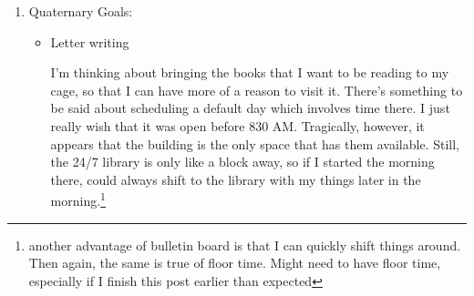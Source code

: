 \documentclass[12pt]{article}
\renewcommand{\,}{\textsuperscript{,}}
\begin{document}
\begin{enumerate}
\begin{itemize}

\item Blogging?

I'm finally going to post this one.

\item Reading?

Nope, but I think that part of it is that I'm not reading anything worthwhile right now.\footnote{meaning that like none of the books I keep on my phone are dragging me in, and otherwise I don't keep books nearby enough}

\item Web Noveling?

No, but I would like to get back into it.  
Thankfully, the bulletin board\footnote{the more times I type it, the fewer attempts it takes to spell correctly. Also, yes I'm hoping that the repetition makes me actually get it} has my notes from before giving up.

\item Guitar?

Spent a solid few minutes last night working through a few exercises.  
I'm getting better at reading staff notation for the guitar, which feels really nice, if also more than a little strange.

\item Other hobbies?

Not so much.

\end{itemize}

\item Quaternary Goals:

\begin{itemize}

\item Letter writing

I'm thinking about bringing the books that I want to be reading to my cage, so that I can have more of a reason to visit it.  
There's something to be said about scheduling a default day which involves time there.  
I just really wish that it was open before 830 AM.  
Tragically, however, it appears that the building is the only space that has them available.  
Still, the 24/7 library is only like a block away, so if I started the morning there, could always shift to the library with my things later in the morning.\footnote{another advantage of bulletin board is that I can quickly shift things around. Then again, the same is true of floor time. Might need to have floor time, especially if I finish this post earlier than expected}


\end{itemize}
\end{enumerate}
\end{document}
